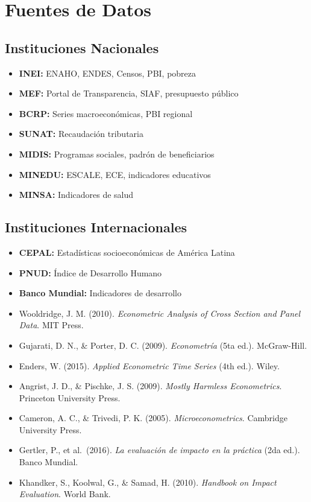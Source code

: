 \documentclass[
  man,
  floatsintext,
  longtable,
  a4paper,
  nolmodern,
  notxfonts,
  notimes,
  12pt,
  colorlinks=true,linkcolor=blue,citecolor=blue,urlcolor=blue]{apa7}
\providecommand{\tightlist}{%
  \setlength{\itemsep}{0pt}\setlength{\parskip}{0pt}}
\begin{document}
\section{Fuentes de Datos}\label{fuentes-de-datos}

\subsection{Instituciones Nacionales}\label{instituciones-nacionales}

\begin{itemize}
\tightlist
\item
  \textbf{INEI:} ENAHO, ENDES, Censos, PBI, pobreza
\item
  \textbf{MEF:} Portal de Transparencia, SIAF, presupuesto público
\item
  \textbf{BCRP:} Series macroeconómicas, PBI regional
\item
  \textbf{SUNAT:} Recaudación tributaria
\item
  \textbf{MIDIS:} Programas sociales, padrón de beneficiarios
\item
  \textbf{MINEDU:} ESCALE, ECE, indicadores educativos
\item
  \textbf{MINSA:} Indicadores de salud
\end{itemize}

\subsection{Instituciones
Internacionales}\label{instituciones-internacionales}

\begin{itemize}
\tightlist
\item
  \textbf{CEPAL:} Estadísticas socioeconómicas de América Latina
\item
  \textbf{PNUD:} Índice de Desarrollo Humano
\item
  \textbf{Banco Mundial:} Indicadores de desarrollo
\end{itemize}

\begin{itemize}
\tightlist
\item
  Wooldridge, J. M. (2010). \emph{Econometric Analysis of Cross Section
  and Panel Data}. MIT Press.
\item
  Gujarati, D. N., \& Porter, D. C. (2009). \emph{Econometría} (5ta
  ed.). McGraw-Hill.
\item
  Enders, W. (2015). \emph{Applied Econometric Time Series} (4th ed.).
  Wiley.
\item
  Angrist, J. D., \& Pischke, J. S. (2009). \emph{Mostly Harmless
  Econometrics}. Princeton University Press.
\item
  Cameron, A. C., \& Trivedi, P. K. (2005). \emph{Microeconometrics}.
  Cambridge University Press.
\item
  Gertler, P., et al.~(2016). \emph{La evaluación de impacto en la
  práctica} (2da ed.). Banco Mundial.
\item
  Khandker, S., Koolwal, G., \& Samad, H. (2010). \emph{Handbook on
  Impact Evaluation}. World Bank.
\end{itemize}
\end{document}
